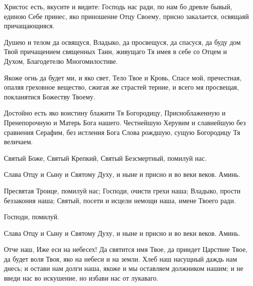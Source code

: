 \begin{mymulticols}
Христос есть, вкусите и видите: Господь нас ради, по нам бо древле бывый, единою Себе принес, яко приношение Отцу Своему, присно закалается, освящаяй причащающияся.


Душею и телом да освящуся, Владыко, да просвещуся, да спасуся, да буду дом Твой причащением священных Таин, живущаго Тя имея в себе со Отцем и Духом, Благодетелю Многомилостиве.


Якоже огнь да будет ми, и яко свет, Тело Твое и Кровь, Спасе мой, пречестная, опаляя греховное вещество, сжигая же страстей терние, и всего мя просвещая, покланятися Божеству Твоему.




Достойно есть яко воистину блажити Тя Богородицу, Присноблаженную и Пренепорочную и Матерь Бога нашего. Честнейшую Херувим и славнейшую без сравнения Серафим, без истления Бога Слова рождшую, сущую Богородицу Тя величаем.

Святый Боже, Святый Крепкий, Святый Безсмертный, помилуй нас. 

Слава Отцу и Сыну и Святому Духу, и ныне и присно и во веки веков. Аминь.

Пресвятая Троице, помилуй нас; Господи, очисти грехи наша; Владыко, прости беззакония наша; Святый, посети и исцели немощи наша, имене Твоего ради.

Господи, помилуй. 

Слава Отцу и Сыну и Святому Духу, и ныне и присно и во веки веков. Аминь.

Отче наш, Иже еси на небесех! Да святится имя Твое, да приидет Царствие Твое, да будет воля Твоя, яко на небеси и на земли. Хлеб наш насущный даждь нам днесь; и остави нам долги наша, якоже и мы оставляем должником нашим; и не введи нас во искушение, но избави нас от лукаваго.



\end{mymulticols}
